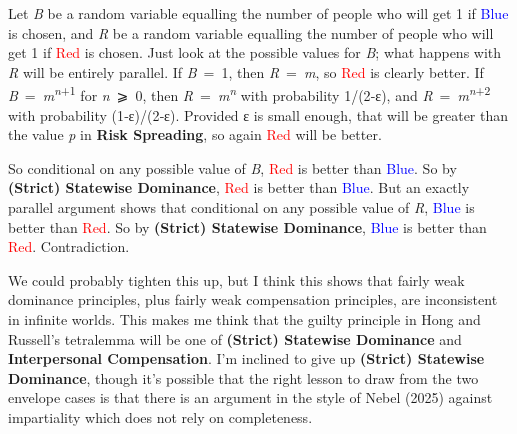 \documentclass[
  letterpaper,
  DIV=11,
  numbers=noendperiod]{scrartcl}
\begin{document}
Let \emph{B} be a random variable equalling the number of people who
will get 1 if \textcolor{blue}{Blue} is chosen, and \emph{R} be a random
variable equalling the number of people who will get 1 if
\textcolor{red}{Red} is chosen. Just look at the possible values for
\emph{B}; what happens with \emph{R} will be entirely parallel. If
\emph{B}~=~1, then \emph{R}~=~\emph{m}, so \textcolor{red}{Red} is
clearly better. If \emph{B}~=~\emph{m}\textsuperscript{\emph{n}+1} for
\emph{n}~⩾~0, then \emph{R}~=~\emph{m\textsuperscript{n}} with
probability 1/(2‑ε), and \emph{R}~=~\emph{m}\textsuperscript{\emph{n}+2}
with probability (1‑ε)/(2‑ε). Provided ε is small enough, that will be
greater than the value \emph{p} in \textbf{Risk Spreading}, so again
\textcolor{red}{Red} will be better.

So conditional on any possible value of \emph{B}, \textcolor{red}{Red}
is better than \textcolor{blue}{Blue}. So by \textbf{(Strict) Statewise
Dominance}, \textcolor{red}{Red} is better than \textcolor{blue}{Blue}.
But an exactly parallel argument shows that conditional on any possible
value of \emph{R}, \textcolor{blue}{Blue} is better than
\textcolor{red}{Red}. So by \textbf{(Strict) Statewise Dominance},
\textcolor{blue}{Blue} is better than \textcolor{red}{Red}.
Contradiction.

We could probably tighten this up, but I think this shows that fairly
weak dominance principles, plus fairly weak compensation principles, are
inconsistent in infinite worlds. This makes me think that the guilty
principle in Hong and Russell's tetralemma will be one of
\textbf{(Strict) Statewise Dominance} and \textbf{Interpersonal
Compensation}. I'm inclined to give up \textbf{(Strict) Statewise
Dominance}, though it's possible that the right lesson to draw from the
two envelope cases is that there is an argument in the style of Nebel
(2025) against impartiality which does not rely on completeness.
\end{document}
